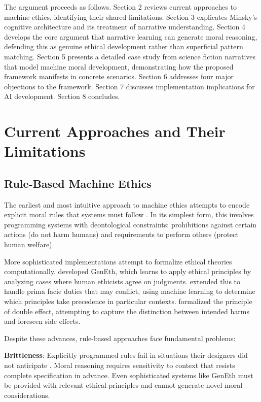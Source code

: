 \documentclass[12pt]{article}
\begin{document}
The argument proceeds as follows. Section 2 reviews current approaches to machine ethics, identifying their shared limitations. Section 3 explicates Minsky's cognitive architecture and its treatment of narrative understanding. Section 4 develops the core argument that narrative learning can generate moral reasoning, defending this as genuine ethical development rather than superficial pattern matching. Section 5 presents a detailed case study from science fiction narratives that model machine moral development, demonstrating how the proposed framework manifests in concrete scenarios. Section 6 addresses four major objections to the framework. Section 7 discusses implementation implications for AI development. Section 8 concludes.

\section{Current Approaches and Their Limitations}

\subsection{Rule-Based Machine Ethics}

The earliest and most intuitive approach to machine ethics attempts to encode explicit moral rules that systems must follow \citep{asimov1950robot, gips1995towards}. In its simplest form, this involves programming systems with deontological constraints: prohibitions against certain actions (do not harm humans) and requirements to perform others (protect human welfare).

More sophisticated implementations attempt to formalize ethical theories computationally. \citet{anderson2008geneth} developed GenEth, which learns to apply ethical principles by analyzing cases where human ethicists agree on judgments. \citet{anderson2011machine} extended this to handle prima facie duties that may conflict, using machine learning to determine which principles take precedence in particular contexts. \citet{berreby2015modelling} formalized the principle of double effect, attempting to capture the distinction between intended harms and foreseen side effects.

Despite these advances, rule-based approaches face fundamental problems:

\textbf{Brittleness}: Explicitly programmed rules fail in situations their designers did not anticipate \citep{bryson2018patiency}. Moral reasoning requires sensitivity to context that resists complete specification in advance. Even sophisticated systems like GenEth must be provided with relevant ethical principles and cannot generate novel moral considerations.
\end{document}
